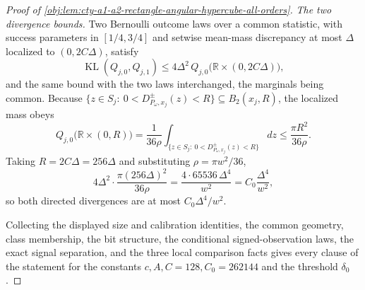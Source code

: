 \begin{proof}[Proof of \cref{obj:lem:cty-a1-a2-rectangle-angular-hypercube-all-orders}]
\emph{The two divergence bounds.}
Two Bernoulli outcome laws over a common statistic, with success parameters in \([1/4,3/4]\) and setwise mean-mass discrepancy at most \(\Delta\) localized to \((0,2C\Delta)\), satisfy
\[
\operatorname{KL}(Q_{j,0},Q_{j,1})
\leq
4\Delta^2\,Q_{j,0}\bigl(\mathbb R\times(0,2C\Delta)\bigr),
\]
and the same bound with the two laws interchanged, the marginals being common.
Because \(\{z\in S_j:\ 0<D^{\pm}_{P_\omega,x_j}(z)<R\}\subseteq B_2(x_j,R)\), the localized mass obeys
\[
Q_{j,0}\bigl(\mathbb R\times(0,R)\bigr)
=
\frac1{36\rho}\int_{\{z\in S_j:\ 0<D^{\pm}_{P_\omega,x_j}(z)<R\}}dz
\leq
\frac{\pi R^2}{36\rho}.
\]
Taking \(R=2C\Delta=256\Delta\) and substituting \(\rho=\pi w^2/36\),
\[
4\Delta^2\cdot\frac{\pi(256\Delta)^2}{36\rho}
=
\frac{4\cdot 65536\,\Delta^4}{w^2}
=
C_0\frac{\Delta^4}{w^2},
\]
so both directed divergences are at most \(C_0\Delta^4/w^2\).

Collecting the displayed size and calibration identities, the common geometry, class membership, the bit structure, the conditional signed-observation laws, the exact signal separation, and the three local comparison facts gives every clause of the statement for the constants \(c,A,C=128,C_0=262144\) and the threshold \(\delta_0\).
\end{proof}
